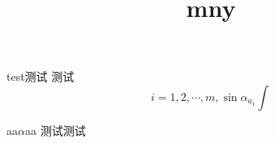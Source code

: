 \documentclass{ctexart}
\title{mny}
\author{}
\begin{document}
\maketitle
test测试
测试
\begin{equation}
    i=1,2,\cdots,m
    , \sin\alpha _{a_1}  \int
\end{equation}

aa$\alpha$aa
测试测试
\end{document}
